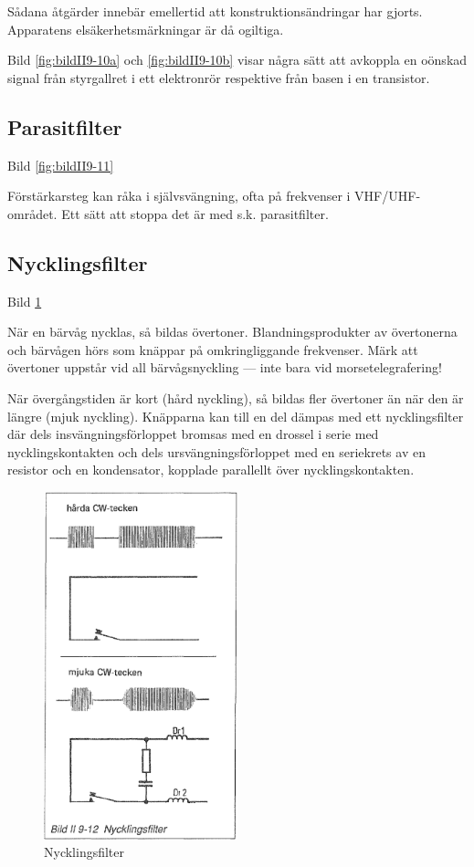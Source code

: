 Sådana åtgärder innebär emellertid att konstruktionsändringar har
gjorts. Apparatens elsäkerhetsmärkningar är då ogiltiga.

Bild \ref{fig:bildII9-10a} och \ref{fig:bildII9-10b} visar några sätt att avkoppla en oönskad signal från styrgallret i ett elektronrör respektive från basen i en
transistor.

\subsection{Parasitfilter}

Bild \ref{fig:bildII9-11}

Förstärkarsteg kan råka i självsvängning, ofta på frekvenser i
VHF/UHF-området. Ett sätt att stoppa det är med s.k. parasitfilter.

\subsection{Nycklingsfilter}

Bild \ref{fig:bildII9-12}

När en bärvåg nycklas, så bildas övertoner.  Blandningsprodukter av
övertonerna och bärvågen hörs som knäppar på omkringliggande
frekvenser. Märk att övertoner uppstår vid all bärvågsnyckling --- inte
bara vid morsetelegrafering!

När övergångstiden är kort (hård nyckling), så bildas fler övertoner
än när den är längre (mjuk nyckling). Knäpparna kan till en del dämpas
med ett nycklingsfilter där dels insvängningsförloppet bromsas med en
drossel i serie med nycklingskontakten och dels ursvängningsförloppet
med en seriekrets av en resistor och en kondensator, kopplade
parallellt över nycklingskontakten.

\begin{figure}
  \includegraphics[width=0.5\textwidth]{images/bild_2_9-12}
  \caption{Nycklingsfilter}
  \label{fig:bildII9-12}
\end{figure}

